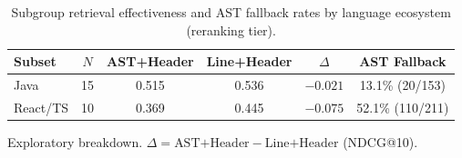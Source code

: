 \begin{table}[t]
\caption{Subgroup retrieval effectiveness and AST fallback rates by language ecosystem (reranking tier).}
\label{tab:language_subgroup}
\centering\footnotesize
\setlength{\tabcolsep}{3pt}
\begin{threeparttable}
\begin{tabular}{@{}lccccc@{}}
\toprule
Subset & $N$ & AST+Header & Line+Header & $\Delta$ & AST Fallback \\
\midrule
Java & 15 & 0.515 & 0.536 & $-0.021$ & 13.1\% (20/153) \\
React/TS & 10 & 0.369 & 0.445 & $-0.075$ & 52.1\% (110/211) \\
\bottomrule
\end{tabular}
\begin{tablenotes}\footnotesize
\item[] Exploratory breakdown. $\Delta = \text{AST+Header} - \text{Line+Header}$ (NDCG@10).
\end{tablenotes}
\end{threeparttable}
\end{table}
